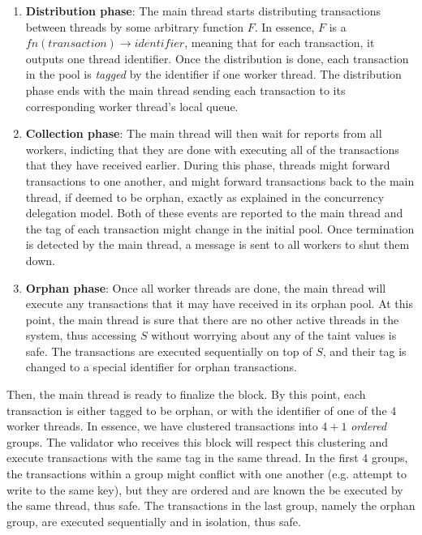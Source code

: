 \begin{enumerate}
	\item \textbf{Distribution phase}: The main thread starts distributing transactions between
	threads by some arbitrary function $F$. In essence, $F$ is a $fn(transaction) \rightarrow identifier$,
	meaning that for each transaction, it outputs one thread identifier. Once the distribution is
	done, each transaction in the pool is \textit{tagged} by the identifier if one worker thread.
	The distribution phase ends with the main thread sending each transaction to its corresponding
	worker thread's local queue.

	\item \textbf{Collection phase}: The main thread will then wait for reports from all workers,
	indicting that they are done with executing all of the transactions that they have received
	earlier. During this phase, threads might forward transactions to one another, and might forward
	transactions back to the main thread, if deemed to be orphan, exactly as explained in the
	concurrency delegation model. Both of these events are reported to the main thread and the tag
	of each transaction might change in the initial pool. Once termination is detected by the main
	thread, a message is sent to all workers to shut them down.

	\item \textbf{Orphan phase}: Once all worker threads are done, the main thread will execute any
	transactions that it may have received in its orphan pool. At this point, the main thread is
	sure that there are no other active threads in the system, thus accessing $S$ without worrying
	about any of the taint values is safe. The transactions are executed sequentially on top of $S$,
	and their tag is changed to a special identifier for orphan transactions.
\end{enumerate}

Then, the main thread is ready to finalize the block. By this point, each transaction is either
tagged to be orphan, or with the identifier of one of the $4$ worker threads. In essence, we have
clustered transactions into $4 + 1$ \textit{ordered} groups. The validator who receives this block
will respect this clustering and execute transactions with the same tag in the same thread. In the
first $4$ groups, the transactions within a group might conflict with one another (e.g. attempt to
write to the same key), but they are ordered and are known the be executed by the same thread, thus
safe. The transactions in the last group, namely the orphan group, are executed sequentially and in
isolation, thus safe.

